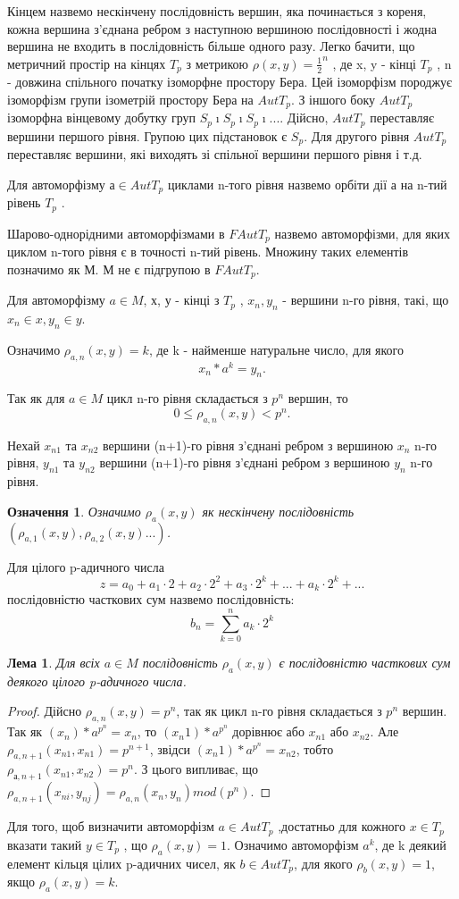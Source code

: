 \documentclass[a4paper,12pt]{article} \usepackage{a4wide}
\numberwithin{equation}{subsection}
\newtheorem{lemma}{Лема}[subsection]
\newtheorem{definition}{Означення}[subsection]
\begin{document}
 Кінцем назвемо нескінчену послідовність вершин, яка починається з кореня, кожна вершина з'єднана ребром з наступною вершиною послідовності і жодна вершина не входить в послідовність більше одного разу. Легко бачити, що метричний простір на кінцях $T_p$  з метрикою
    $\rho (x, y)=\frac{1}{2}^n$ , де  x, y - кінці $T_p$ , n - довжина спільного початку ізоморфне простору Бера. Цей ізоморфізм породжує ізоморфізм групи ізометрій простору Бера на $AutT_p$.
З іншого боку $AutT_p$ ізоморфна вінцевому добутку груп $S_p\imath S_p\imath S_p\imath ... $. Дійсно, $AutT_p$ переставляє вершини першого рівня. Групою цих підстановок є $S_p$. Для другого рівня $AutT_p$ переставляє вершини, які виходять зі спільної вершини першого рівня і т.д.

Для автоморфізму $а \in AutT_p$ циклами n-того рівня  назвемо орбіти дії а на n-тий рівень $T_p$ .

Шарово-однорідними автоморфізмами в $FAutT_p$  назвемо автоморфізми, для яких циклом n-того рівня  є в точності n-тий рівень. Множину таких елементів позначимо як М. М не є підгрупою в $FAutT_p$.

Для автоморфізму $a \in M$, х, у - кінці з $T_p$ ,  $x_n , y_n$ - вершини n-го рівня, такі, що $x_n \in   x, y_n \in  y$.


 Означимо  $\rho_{a,n} (x, y)=k$, де k - найменше натуральне число, для якого $$x_n* a^k = y_n.$$

  Так як для $a \in  M$ цикл n-го рівня  складається з $p^n$ вершин, то $$0\leq \rho_{a,n} (x, y) < p^n.$$


Нехай $x_{n1}$ та $x_{n2}$ вершини (n+1)-го рівня з'єднані ребром з вершиною $x_n$ n-го рівня, $y_{n1}$  та $y_{n2}$   вершини (n+1)-го рівня з'єднані ребром з вершиною $y_n$ n-го рівня.
\begin{definition}
 Означимо $\rho_a (x, y)$ як нескінчену послідовність $( \rho_{a,1} (x, y),  \rho_{a,2} (x, y)...)$.
 \end{definition}
 Для цілого p-адичного числа $$z=a_0+a_1\cdot 2+ a_2\cdot 2^2+a_3\cdot 2^k+...+a_k\cdot 2^k+...$$
 послідовністю часткових сум назвемо послідовність: $$b_n=\sum\limits_{k = 0}^n {a_k }  \cdot 2^k$$
\begin{lemma}  Для всіх $a \in  M$ послідовність $ \rho_a (x, y)$ є послідовністю часткових сум деякого цілого p-адичного числа.
\end{lemma}
\begin{proof}Дійсно $\rho_{a,n} (x, y) = p^n$, так як цикл n-го рівня  складається з $p^n$ вершин. Так як $(x_n)*a^{p^n}= x_n$, то
       $(x_n1)*a^{p^n}$ дорівнює або $x_{n1}$ або $x_{n2}$. Але  $\rho_{a,n+1}  (x_{n1}, x_{n1}) = p^{n+1}$,
        звідси  $(x_n1)*a^{p^n}= x_{n2}$, тобто  $\rho_{а,n+1}(x_{n1}, x_{n2}) = p^n$.
З цього випливає, що $\rho_ {a,n+1}(x_{ni}, y_{nj})=\rho_   {a,n}(x_n, y_n)mod(p^n)$.
\end{proof}
Для того, щоб визначити автоморфізм   $a\in AutT_p$ ,достатньо для кожного $x \in   T_p$ вказати такий $y \in   T_p$  , що  $\rho_a (x, y)=1$.
Означимо автоморфізм $a^k$, де k деякий елемент кільця цілих p-адичних чисел,
  як   $b \in AutT_p$, для якого  $\rho_b (x, y)=1$, якщо  $\rho_a (x, y)=k$.
\end{document}
